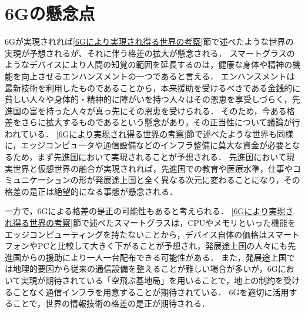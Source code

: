 \documentclass[a4paper,10pt,uplatex]{jsarticle}
\begin{document}
\section{6Gの懸念点}
6Gが実現されれば\ref{6Gにより実現され得る世界の考察}節で述べたような世界の実現が予想されるが、それに伴う格差の拡大が懸念される．
スマートグラスのようなデバイスにより人間の知覚の範囲を延長するのは，健康な身体や精神の機能を向上させるエンハンスメントの一つであると言える．
エンハンスメントは最新技術を利用したものであることから，本来援助を受けるべきである金銭的に貧しい人々や身体的・精神的に障がいを持つ人々はその恩恵を享受しづらく，先進国の富を持った人々が真っ先にその恩恵を受けられる．
そのため，今ある格差をさらに拡大するものであるという懸念があり，その正当性について議論が行われている\cite{エンハンスメント}．
\ref{6Gにより実現され得る世界の考察}節で述べたような世界も同様に，エッジコンピュータや通信設備などのインフラ整備に莫大な資金が必要となるため，まず先進国において実現されることが予想される．
先進国において現実世界と仮想世界の融合が実現されれば，先進国での教育や医療水準，仕事やコミュニケーションの形が発展途上国と全く異なる次元に変わることになり，その格差の是正は絶望的になる事態が懸念される．\par
一方で，6Gによる格差の是正の可能性もあると考えられる．
\ref{6Gにより実現され得る世界の考察}節で述べたスマートグラスは，CPUやメモリといった機能をエッジコンピューティングを持たないことから，デバイス自体の価格はスマートフォンやPCと比較して大きく下がることが予想され，発展途上国の人々にも先進国からの援助により一人一台配布できる可能性がある．
また，発展途上国では地理的要因から従来の通信設備を整えることが難しい場合が多いが，6Gにおいて実現が期待されている「空飛ぶ基地局」を用いることで，地上の制約を受けることなく通信インフラを用意することが期待されている\cite{空飛ぶ基地局}．
6Gを適切に活用することで，世界の情報技術の格差の是正が期待される．
\end{document}
